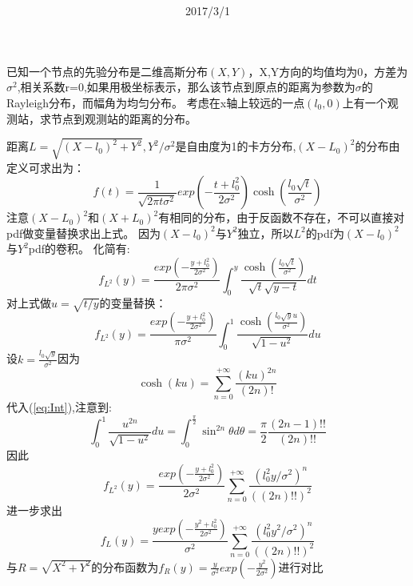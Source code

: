 \documentclass[12pt]{article}
\theoremstyle{remark}
\begin{document}
\title{\textbf{}} 
\date{2017/3/1}
\author{}
\maketitle
\large
已知一个节点的先验分布是二维高斯分布$(X,Y)$，X,Y方向的均值均为0，方差为$\sigma^2$,相关系数r=0,如果用极坐标表示，那么该节点到原点的距离为参数为$\sigma$的Rayleigh分布，而幅角为均匀分布。
考虑在x轴上较远的一点$(l_0,0)$上有一个观测站，求节点到观测站的距离的分布。

距离$L=\sqrt{(X-l_0)^2+Y^2},Y^2/\sigma^2$是自由度为1的卡方分布,$(X-L_0)^2$的分布由定义可求出为：
\begin{equation}
f(t)=\frac{1}{\sqrt{2\pi t\sigma^2}}exp(-\frac{t+l_0^2}{2\sigma^2})\cosh(\frac{l_0\sqrt{t}}{\sigma^2})
\end{equation}
注意$(X-L_0)^2$和$(X+L_0)^2$有相同的分布，由于反函数不存在，不可以直接对pdf做变量替换求出上式。
因为$(X-l_0)^2$与$Y^2$独立，所以$L^2$的pdf为$(X-l_0)^2$与$Y^2$pdf的卷积。
化简有:
\begin{equation}
f_{L^2}(y)=\frac{exp(-\frac{y+l_0^2}{2\sigma^2})}{2\pi\sigma^2}\int_0^y \frac{\cosh(\frac{l_0\sqrt{t}}{\sigma^2})}{\sqrt{t}\sqrt{y-t}}dt
\end{equation}
对上式做$u=\sqrt{t/y}$的变量替换：
\begin{equation}\label{eq:Int}
f_{L^2}(y)=\frac{exp(-\frac{y+l_0^2}{2\sigma^2})}{\pi\sigma^2}\int_0^1 \frac{\cosh(\frac{l_0\sqrt{y}u}{\sigma^2})}{\sqrt{1-u^2}}du
\end{equation}
设$k=\frac{l_0\sqrt{y}}{\sigma^2}$因为
\begin{equation}
\cosh(ku)=\sum_{n=0}^{+\infty} \frac{(ku)^{2n}}{(2n)!}
\end{equation}
代入(\ref{eq:Int}),注意到:
\begin{equation}
\int_0^1 \frac{u^{2n}}{\sqrt{1-u^2}}du=\int_0^{\frac{\pi}{2}} \sin^{2n} \theta d\theta=\frac{\pi}{2}\frac{(2n-1)!!}{(2n)!!} 
\end{equation}
因此
\begin{equation}
f_{L^2}(y)=\frac{exp(-\frac{y+l_0^2}{2\sigma^2})}{2\sigma^2}\sum_{n=0}^{+\infty}\frac{(l_0^2 y/\sigma^2)^n}{((2n)!!)^2}
\end{equation}
进一步求出
\begin{equation}
f_{L}(y)=\frac{yexp(-\frac{y^2+l_0^2}{2\sigma^2})}{\sigma^2}\sum_{n=0}^{+\infty}\frac{(l_0^2 y^2/\sigma^2)^n}{((2n)!!)^2}
\end{equation}
与$R=\sqrt{X^2+Y^2}$的分布函数为$f_{R}(y)=\frac{y}{\sigma^2}exp(-\frac{y^2}{2\sigma^2})$进行对比
\end{document}
